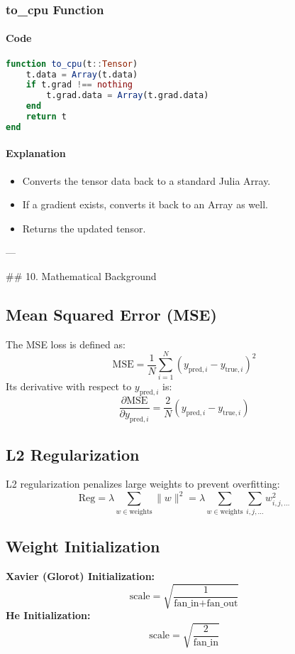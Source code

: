 \documentclass[11pt]{article}
\begin{document}
\subsubsection{to\_cpu Function}
\paragraph{Code}
\begin{lstlisting}[language=Julia]
function to_cpu(t::Tensor)
    t.data = Array(t.data)
    if t.grad !== nothing
        t.grad.data = Array(t.grad.data)
    end
    return t
end
\end{lstlisting}

\paragraph{Explanation}
\begin{itemize}
    \item Converts the tensor data back to a standard Julia Array.
    \item If a gradient exists, converts it back to an Array as well.
    \item Returns the updated tensor.
\end{itemize}

---

## 10. Mathematical Background

\subsection*{Mean Squared Error (MSE)}
The MSE loss is defined as:
\[
\text{MSE} = \frac{1}{N} \sum_{i=1}^{N} (y_{\text{pred}, i} - y_{\text{true}, i})^2
\]
Its derivative with respect to \( y_{\text{pred}, i} \) is:
\[
\frac{\partial \text{MSE}}{\partial y_{\text{pred}, i}} = \frac{2}{N} (y_{\text{pred}, i} - y_{\text{true}, i})
\]

\subsection*{L2 Regularization}
L2 regularization penalizes large weights to prevent overfitting:
\[
\text{Reg} = \lambda \sum_{w \in \text{weights}} \|w\|^2 = \lambda \sum_{w \in \text{weights}} \sum_{i,j,\ldots} w_{i,j,\ldots}^2
\]

\subsection*{Weight Initialization}
\textbf{Xavier (Glorot) Initialization:}
\[
\text{scale} = \sqrt{\frac{1}{\text{fan\_in} + \text{fan\_out}}}
\]
\textbf{He Initialization:}
\[
\text{scale} = \sqrt{\frac{2}{\text{fan\_in}}}
\]
\end{document}
